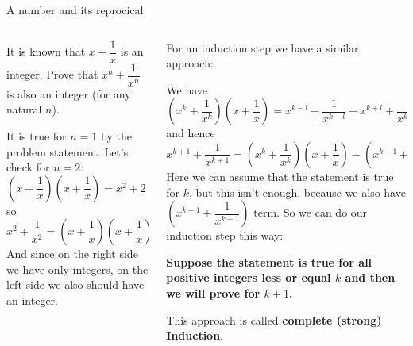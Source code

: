 \documentclass[9pt,aspectratio=169]{beamer}
\begin{document}
\begin{frame}{A number and its reprocical}
  \begin{columns}[T]
    \begin{column}{0.5\textwidth}
      \begin{problem}
        It is known that $x + \dfrac{1}{x}$ is an integer. Prove that $x^{n} + \dfrac{1}{x^{n}}$ is also an integer (for any natural $n$).
      \end{problem}\pause
      It is true for $n=1$ by the problem statement. Let's check for $n=2$:
      \[
        \left(x + \dfrac{1}{x}\right) \left(x + \dfrac{1}{x}\right) = x^2 + 2 + \frac{1}{x^2},
      \] so
      \[ 
        x^2 + \frac{1}{x^2} = \left(x + \dfrac{1}{x}\right) \left(x + \dfrac{1}{x}\right) - 2.
      \]
      And since on the right side we have only integers, on the left side we also should have an integer.\pause
    \end{column}
    \begin{column}{0.5\textwidth}
      For an induction step we have a similar approach:

      We have 
      \[
        \left(x^k + \dfrac{1}{x^k}\right) \left(x + \dfrac{1}{x}\right) = x^{k-l} + \frac{1}{x^{k-l}} + x^{k+l} + \frac{1}{x^{k+1}}
      \] 
      and hence \pause
      \[
        x^{k+1} + \frac{1}{x^{k+1}} = \left(x^k + \frac{1}{x^k}\right)\left(x + \frac{1}{x}\right) - \left(x^{k-1} + \frac{1}{x^{k-1}}\right).
      \]\pause
      Here we can assume that the statement is true for $k$, but this isn't enough, because we also have $\left(x^{k-1} + \dfrac{1}{x^{k-1}}\right)$ term. So we can do our induction step this way: \pause

      \begin{definition}
        \textbf{Suppose the statement is true for all positive integers less or equal $k$ and then we will prove for $k+1$.}

        This approach is called \textbf{complete (strong) Induction}.
      \end{definition}

    \end{column}
  \end{columns}
\end{frame}
\end{document}
